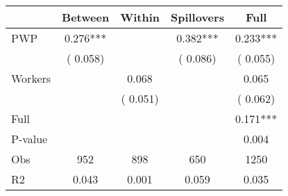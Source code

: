 
\begin{tabular}{l*{4}{c}}\hline&\multicolumn{1}{c}{Between}&\multicolumn{1}{c}{Within}&\multicolumn{1}{c}{Spillovers}&\multicolumn{1}{c}{Full}\\ \hline
 PWP           &              0.276***      &                                               &        0.382*** &         0.233***                            \\ 
                               &        (       0.058)           &                                       &       (       0.086)     &      (       0.055)                                           \\ 
 Workers       &                                               &        0.068    &                                &             0.065                            \\ 
                               &                                               & (       0.051)                  &                                        &      (       0.062)                                           \\ 
\hline                                                                                                                                                                                                                                            
 Full                  &                                               &                                               &                                        &             0.171***                                     \\ 
 P-value               &                                               &                                               &                                        &             0.004                                           \\ 
 Obs                   &               952               &       898                       &       650                &              1250                                               \\ 
 R2                    &                      0.043              &              0.001                      &              0.059               &                     0.035                                              \\ 
\hline \end{tabular}                                                                                                                                                                                                              